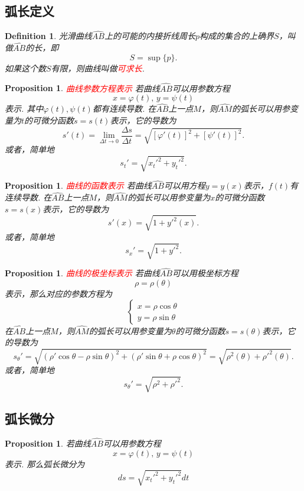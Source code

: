 \documentclass{article}
\newtheorem{proposition}[theorem]{Proposition}
\newtheorem{definition}[theorem]{Definition}
\newcommand{\redt}[1]{\textcolor{red}{#1}}
\begin{document}
\subsection{弧长定义}

\begin{definition}
\rm 光滑曲线$\widehat{AB}$上的可能的内接折线周长$p$构成的集合的上确界$S$，叫做$\widehat{AB}$的长，即
$$
S = \sup\{p\}.
$$
如果这个数$S$有限，则曲线叫做\redt{可求长}.
\end{definition}

\begin{proposition}
\rm \redt{曲线参数方程表示} 若曲线$\widehat{AB}$可以用参数方程
$$
x = \varphi(t), \, y = \psi(t) 
$$
表示. 其中$\varphi(t),\psi(t)$都有连续导数. 在$\widehat{AB}$上一点$M$，则$\widehat{AM}$的弧长可以用参变量为$t$的可微分函数$s = s(t)$表示，它的导数为
$$
s'(t) = \lim\limits_{\Delta t \to 0}\frac{\Delta s}{\Delta t} = \sqrt{[\varphi'(t)]^2+[\psi'(t)]^2}.
$$
或者，简单地
$$
s_t' = \sqrt{x_t'^2 + y_t'^2}. 
$$
\end{proposition}

\begin{proposition}
\rm \redt{曲线的函数表示} 若曲线$\widehat{AB}$可以用方程$y=y(x)$表示，$f(t)$有连续导数. 在$\widehat{AB}$上一点$M$，则$\widehat{AM}$的弧长可以用参变量为$x$的可微分函数$s = s(x)$表示，它的导数为
$$
s'(x) = \sqrt{1+y'^2(x)}. 
$$
或者，简单地
$$
s_x' = \sqrt{1+y'^2}.
$$
\end{proposition}

\begin{proposition}
\rm \redt{曲线的极坐标表示} 若曲线$\widehat{AB}$可以用极坐标方程
$$
\rho = \rho(\theta)
$$
表示，那么对应的参数方程为
$$
\left \{
\begin{array}{ll}
x = \rho\cos\theta \\
y = \rho\sin\theta
\end{array} \right.
$$
在$\widehat{AB}$上一点$M$，则$\widehat{AM}$的弧长可以用参变量为$\theta$的可微分函数$s = s(\theta)$表示，它的导数为
$$
s_\theta' = \sqrt{(\rho'\cos\theta-\rho\sin\theta)^2 +(\rho'\sin\theta+\rho\cos\theta)^2} = \sqrt{\rho^2(\theta) + \rho'^2(\theta)}.
$$
或者，简单地
$$
s_\theta' = \sqrt{\rho^2 + \rho'^2}. 
$$
\end{proposition}

\subsection{弧长微分}

\begin{proposition}
\rm 若曲线$\widehat{AB}$可以用参数方程
$$
x = \varphi(t), \, y = \psi(t) 
$$
表示. 那么弧长微分为
$$
ds = \sqrt{x_t'^2 + y_t'^2}dt
$$
\end{proposition}
\end{document}
